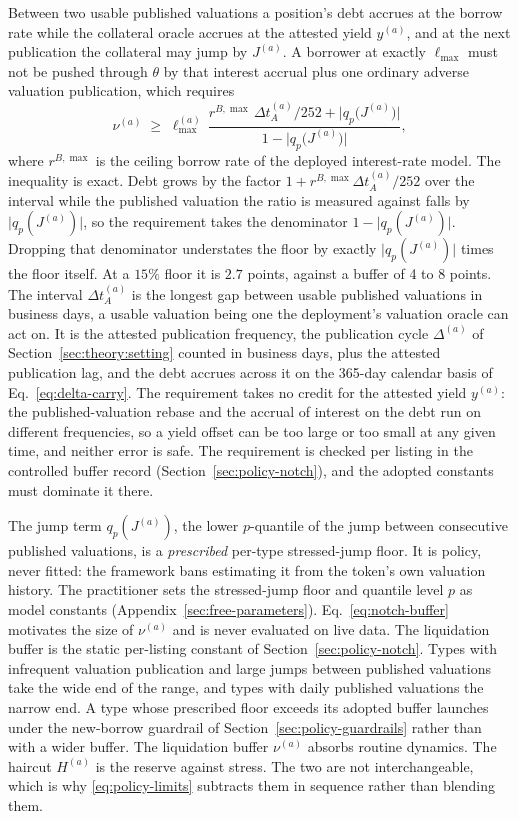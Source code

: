 Between two usable published valuations a position's debt accrues at the borrow rate while the collateral oracle accrues at the attested yield $y^{(a)}$, and at the next publication the collateral may jump by $J^{(a)}$. A borrower at exactly $\ell_{\max}$ must not be pushed through $\theta$ by that interest accrual plus one ordinary adverse valuation publication, which requires
\begin{equation}\label{eq:notch-buffer}
\nu^{(a)} \;\ge\; \ell_{\max}^{(a)}\,
\frac{r^{B,\max}\,\Delta t_A^{(a)}/252 + \bigl|q_p\bigl(J^{(a)}\bigr)\bigr|}
{1 - \bigl|q_p\bigl(J^{(a)}\bigr)\bigr|},
\end{equation}
where $r^{B,\max}$ is the ceiling borrow rate of the deployed interest-rate model. The inequality is exact. Debt grows by the factor $1+r^{B,\max}\Delta t_A^{(a)}/252$ over the interval while the published valuation the ratio is measured against falls by $\bigl|q_p(J^{(a)})\bigr|$, so the requirement takes the denominator $1-\bigl|q_p(J^{(a)})\bigr|$. Dropping that denominator understates the floor by exactly $\bigl|q_p(J^{(a)})\bigr|$ times the floor itself. At a $15\%$ floor it is $2.7$ points, against a buffer of 4 to 8 points. The interval $\Delta t_A^{(a)}$ is the longest gap between usable published valuations in business days, a usable valuation being one the deployment's valuation oracle can act on. It is the attested publication frequency, the publication cycle $\Delta^{(a)}$ of Section~\ref{sec:theory:setting} counted in business days, plus the attested publication lag, and the debt accrues across it on the 365-day calendar basis of Eq.~\eqref{eq:delta-carry}. The requirement takes no credit for the attested yield $y^{(a)}$: the published-valuation rebase and the accrual of interest on the debt run on different frequencies, so a yield offset can be too large or too small at any given time, and neither error is safe. The requirement is checked per listing in the controlled buffer record (Section~\ref{sec:policy-notch}), and the adopted constants must dominate it there.

The jump term $q_p(J^{(a)})$, the lower $p$-quantile of the jump between consecutive published valuations, is a \emph{prescribed} per-type stressed-jump floor. It is policy, never fitted: the framework bans estimating it from the token's own valuation history. The practitioner sets the stressed-jump floor and quantile level $p$ as model constants (Appendix~\ref{sec:free-parameters}). Eq.~\eqref{eq:notch-buffer} motivates the size of $\nu^{(a)}$ and is never evaluated on live data. The liquidation buffer is the static per-listing constant of Section~\ref{sec:policy-notch}. Types with infrequent valuation publication and large jumps between published valuations take the wide end of the range, and types with daily published valuations the narrow end. A type whose prescribed floor exceeds its adopted buffer launches under the new-borrow guardrail of Section~\ref{sec:policy-guardrails} rather than with a wider buffer. The liquidation buffer $\nu^{(a)}$ absorbs routine dynamics. The haircut $H^{(a)}$ is the reserve against stress. The two are not interchangeable, which is why \eqref{eq:policy-limits} subtracts them in sequence rather than blending them.


